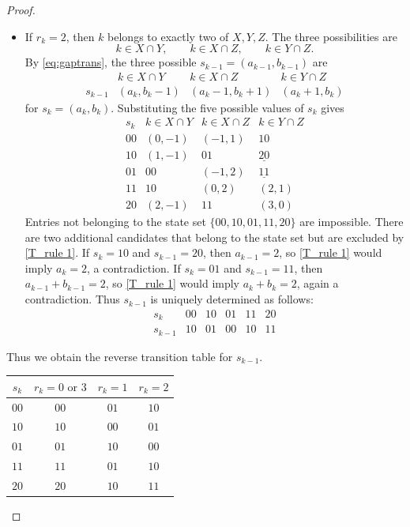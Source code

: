 \documentclass[11pt]{amsart}
\theoremstyle{definition}
\numberwithin{equation}{section}
\begin{document}
\begin{proof}
\begin{itemize}
Thus $s_{k-1}$ is uniquely determined as follows:
$$
\begin{array}{c|ccccc}
s_k&00&10&01&11&20\\
\hline
s_{k-1}&01&00&10&01&10
\end{array}
$$

\item 
If \(r_k=2\), then \(k\) belongs to exactly two of \(X,Y,Z\).  The three possibilities are
$$
k\in X\cap Y,\qquad k\in X\cap Z,\qquad k\in Y\cap Z.
$$
By \eqref{eq:gaptrans}, the three possible $s_{k-1} = (a_{k-1},b_{k-1})$ are
\begin{equation} \label{eq:pred2}
\begin{array}{c|ccc}
 & k\in X\cap Y & k\in X\cap Z & k\in Y\cap Z\\
\hline
s_{k-1}
&
(a_k,b_k-1)
&
(a_k-1,b_k+1)
&
(a_k+1,b_k)
\end{array}
\end{equation}
for \(s_k=(a_k,b_k)\).  Substituting the five possible values of
\(s_k\) gives
$$
\begin{array}{c|ccc}
s_k
& k\in X\cap Y
& k\in X\cap Z
& k\in Y\cap Z\\
\hline
00 & (0,-1) & (-1,1) & 10\\
10 & (1,-1) & 01 & \underline{20}\\
01 & 00 & (-1,2) & \underline{11}\\
11 & 10 & (0,2) & (2,1)\\
20 & (2,-1) & 11 & (3,0)
\end{array}
$$
Entries not belonging to the state set
$
\{00,10,01,11,20\}
$
are impossible.  There are two additional candidates that belong to
the state set but are excluded by \eqref{T_rule 1}.  If \(s_k=10\)
and \(s_{k-1}=20\), then \(a_{k-1}=2\), so \eqref{T_rule 1}
would imply \(a_k=2\), a contradiction.  If \(s_k=01\) and
\(s_{k-1}=11\), then \(a_{k-1}+b_{k-1}=2\), so \eqref{T_rule 1} would imply \(a_k+b_k=2\), again a contradiction.
Thus $s_{k-1}$ is uniquely determined as follows:
$$
\begin{array}{c|ccccc}
s_k&00&10&01&11&20\\
\hline
s_{k-1}&10&01&00&10&11
\end{array}
$$
\end{itemize}


Thus we obtain the reverse transition table for $s_{k-1}$.
\begin{center}
\begin{tabular}{c|ccc}
\toprule
$s_k$ & $r_k=0\text{ or }3$ & $r_k=1$ & $r_k=2$\\
\midrule
$00$ & $00$ & $01$ & $10$\\
$10$ & $10$ & $00$ & $01$\\
$01$ & $01$ & $10$ & $00$\\
$11$ & $11$ & $01$ & $10$\\
$20$ & $20$ & $10$ & $11$\\
\bottomrule
\end{tabular}
\end{center}



\end{proof}
\end{document}
